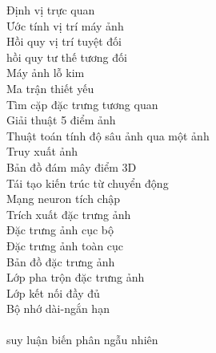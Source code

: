 \begin{keyword}
  		    {Định vị trực quan} 		    \\
  		{Ước tính vị trí máy ảnh} 		\\
  		{Hồi quy vị trí tuyệt đối} 		\\
  		{hồi quy tư thế tương đối} 		\\
  		        {Máy ảnh lỗ kim} 	        	\\
  		        {Ma trận thiết yếu} 		    \\
  		        {Tìm cặp đặc trưng tương quan} 	\\
  		        {Giải thuật 5 điểm ảnh} 		\\
  	{Thuật toán tính độ sâu ảnh qua một ảnh} 		\\
  		        {Truy xuất ảnh} 	        	\\
  		        {Bản đồ đám mây điểm 3D} 		\\
  		    {Tái tạo kiến trúc từ chuyển động} 	\\
  		{Mạng neuron tích chập} 		\\
  	        {Trích xuất đặc trưng ảnh} 		\\
  		        {Đặc trưng ảnh cục bộ} 	        \\
               {Đặc trưng ảnh toàn cục}        \\
                     {Bản đồ đặc trưng ảnh}          \\
                   {Lớp pha trộn đặc trưng ảnh}    \\
           {Lớp kết nối đầy đủ}            \\
          {Bộ nhớ dài-ngắn hạn}           \\
   \\
    {suy luận biến phân ngẫu nhiên} \\

\end{keyword}

